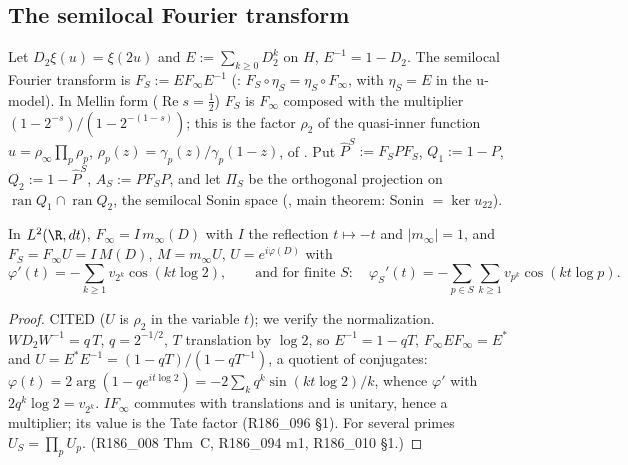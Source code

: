 \subsection{The semilocal Fourier transform}
\begin{definition}\label{def:FS}
Let $D_2\xi(u)=\xi(2u)$ and $E:=\sum_{k\ge0}D_2^k$ on $H$, $E^{-1}=1-D_2$. The semilocal Fourier transform is
$F_S:=EF_\infty E^{-1}$ (\cite[Prop.~4.1]{CCM2023}: $F_S\circ\eta_S=\eta_S\circ F_\infty$, with $\eta_S=E$ in the
u-model). In Mellin form ($\operatorname{Re}s=\frac12$) $F_S$ is $F_\infty$ composed with the multiplier
$(1-2^{-s})/(1-2^{-(1-s)})$; this is the factor $\rho_2$ of the quasi-inner function
$u=\rho_\infty\prod_p\rho_p$, $\rho_p(z)=\gamma_p(z)/\gamma_p(1-z)$, of \cite[Lemma~3.1]{CCquasi2020}.
Put $\widehat P^S:=F_SPF_S$, $Q_1:=1-P$, $Q_2:=1-\widehat P^S$, $A_S:=PF_SP$, and let $\Pi_S$ be the
orthogonal projection on $\operatorname{ran}Q_1\cap\operatorname{ran}Q_2$, the semilocal Sonin space
(\cite{CCquasi2020}, main theorem: Sonin $=\ker u_{22}$).
\end{definition}

\begin{lemma}\label{lem:sl-phase}
In $L^2(\R,dt)$, $F_\infty=I\,m_\infty(D)$ with $I$ the reflection $t\mapsto-t$ and $|m_\infty|=1$, and
$F_S=F_\infty U=I\,M(D)$, $M=m_\infty U$, $U=e^{i\varphi(D)}$ with
\[
\varphi'(t)=-\sum_{k\ge1}v_{2^k}\cos(kt\log2),\qquad\text{and for finite }S:\quad
\varphi_S'(t)=-\sum_{p\in S}\sum_{k\ge1}v_{p^k}\cos(kt\log p).
\]
\end{lemma}
\begin{proof}
CITED \cite[Lemma~3.1]{CCquasi2020} ($U$ is $\rho_2$ in the variable $t$); we verify the normalization.
$WD_2W^{-1}=q\,T$, $q=2^{-1/2}$, $T$ translation by $\log2$, so $E^{-1}=1-qT$, $F_\infty EF_\infty=E^*$ and
$U=E^*E^{-1}=(1-qT)/(1-qT^{-1})$, a quotient of conjugates: $\varphi(t)=2\arg(1-qe^{it\log2})=-2\sum_kq^k\sin(kt\log2)/k$,
whence $\varphi'$ with $2q^k\log2=v_{2^k}$. $IF_\infty$ commutes with translations and is unitary, hence a
multiplier; its value is the Tate factor (R186\_096 \S1). For several primes $U_S=\prod_pU_p$.
(R186\_008 Thm~C, R186\_094 m1, R186\_010 \S1.)
\end{proof}

